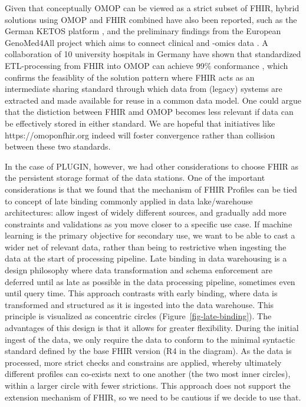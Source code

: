 \documentclass[
  authoryear]{elsarticle}
\begin{document}
Given that conceptually OMOP can be viewed as a strict subset of FHIR,
hybrid solutions using OMOP and FHIR combined have also been reported,
such as the German KETOS platform \citep{gruendner2019ketos}, and the
preliminary findings from the European GenoMed4All project which aims to
connect clinical and -omics data \citep{cremonesi2023need}. A
collaboration of 10 university hospitals in Germany have shown that
standardized ETL-processing from FHIR into OMOP can achieve 99\%
conformance \citep{peng2023etlprocess}, which confirms the feasiblity of
the solution pattern where FHIR acts as an intermediate sharing standard
through which data from (legacy) systems are extracted and made
available for reuse in a common data model. One could argue that the
distiction between FHIR amd OMOP becomes less relevant if data can be
effectively stored in either standard. We are hopeful that initiatives
like https://omoponfhir.org indeed will foster convergence rather than
collision between these two standards.

In the case of PLUGIN, however, we had other considerations to choose
FHIR as the persistent storage format of the data stations. One of the
important considerations is that we found that the mechanism of FHIR
Profiles can be tied to concept of late binding commonly applied in data
lake/warehouse architectures: allow ingest of widely different sources,
and gradually add more constraints and validations as you move closer to
a specific use case. If machine learning is the primary objective for
secondary use, we want to be able to cast a wider net of relevant data,
rather than being to restrictive when ingesting the data at the start of
processing pipeline. Late binding in data warehousing is a design
philosophy where data transformation and schema enforcement are deferred
until as late as possible in the data processing pipeline, sometimes
even until query time. This approach contrasts with early binding, where
data is transformed and structured as it is ingested into the data
warehouse. This principle is visualized as concentric circles
(Figure~\ref{fig-late-binding}). The advantages of this design is that
it allows for greater flexibility. During the initial ingest of the
data, we only require the data to conform to the minimal syntactic
standard defined by the base FHIR version (R4 in the diagram). As the
data is processed, more strict checks and constrains are applied,
whereby ultimately different profiles can co-exists next to one another
(the two most inner circles), within a larger circle with fewer
strictions. This approach does not support the extension mechanism of
FHIR, so we need to be cautious if we decide to use that.
\end{document}
